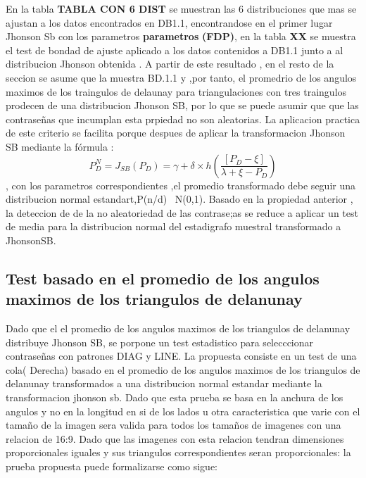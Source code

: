 \documentclass[12pt]{report}
\begin{document}
	 En la tabla \textbf{TABLA CON 6 DIST}  se muestran las 6 distribuciones que mas se ajustan a los datos encontrados en DB1.1, encontrandose en el primer lugar Jhonson Sb con los parametros \textbf{parametros} \textbf{(FDP)}, en la tabla \textbf{XX} se  muestra el test de bondad de ajuste aplicado a los datos contenidos a DB1.1 junto a al distribucion Jhonson obtenida . A partir de este resultado , en el resto de la seccion se asume que la muestra BD.1.1 y ,por tanto, el promedrio de los angulos maximos de los traingulos de delaunay para triangulaciones con tres traingulos prodecen de una distribucion Jhonson SB, por lo que se puede asumir que que las contraseñas que incumplan esta prpiedad no son aleatorias.
	 La aplicacion practica de este criterio se facilita porque despues de aplicar la transformacion Jhonson SB  mediante la fórmula :
	 \[
	 P_D^{N} = J_{SB}(P_D) = \gamma + \delta \times h\left(\frac{[P_D - \xi]}{\lambda + \xi - P_D}\right)
	 \],
	 con los parametros correspondientes ,el promedio transformado debe seguir una distribucion normal estandart,P(n/d) ~N(0,1). Basado en la propiedad anterior , la deteccion de de la no aleatoriedad de las contrase;as se reduce a aplicar un test de media para la distribucion normal del estadigrafo muestral transformado a JhonsonSB.
	 
\subsection{Test basado en el promedio de los angulos maximos de los triangulos de delanunay}
Dado  que el el promedio de los angulos maximos de los triangulos de delanunay distribuye Jhonson SB, se porpone un  test estadistico para selecccionar contraseñas con patrones DIAG y LINE. La propuesta consiste en un test de una cola( Derecha) basado en el promedio de los angulos maximos de los triangulos de delanunay transformados a una distribucion normal estandar mediante la transformacion jhonson sb.
Dado que esta prueba se basa en la anchura de los angulos y no en la longitud en si de los lados u otra caracteristica que varie con el tamaño de la imagen sera valida para todos los tamaños de imagenes con una relacion de 16:9. Dado que las imagenes con esta relacion tendran dimensiones proporcionales iguales y sus triangulos correspondientes seran proporcionales: la prueba propuesta puede formalizarse como sigue:
\end{document}
